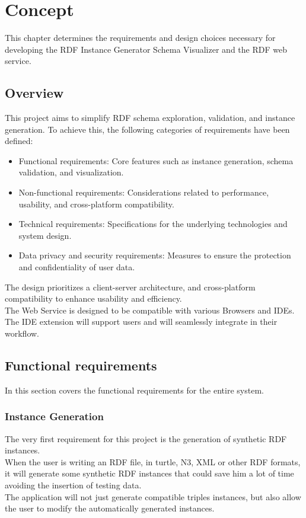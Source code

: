 \chapter{Concept\label{cha:chapter3}}
This chapter determines the requirements and design choices necessary for developing the RDF Instance Generator Schema Visualizer and the RDF web service.

\section{Overview\label{sec:reqoverview}}

This project aims to simplify RDF schema exploration, validation, and instance generation. To achieve this, the following categories of requirements have been defined:
\begin{itemize}
    \item Functional requirements: Core features such as instance generation, schema validation, and visualization.
    \item Non-functional requirements: Considerations related to performance, usability, and cross-platform compatibility.
    \item Technical requirements: Specifications for the underlying technologies and system design.
    \item Data privacy and security requirements: Measures to ensure the protection and confidentiality of user data.
\end{itemize}

The design prioritizes a client-server architecture, and cross-platform compatibility to enhance usability and efficiency. 
\\
The Web Service is designed to be compatible with various Browsers and IDEs. 
\\
The IDE extension will support users and will seamlessly integrate in their workflow.
\section{Functional requirements\label{sec:techreq}}
In this section covers the functional requirements for the entire system.

\subsection{Instance Generation\label{sec:reqsuba}}
The very first requirement for this project is the generation of synthetic RDF instances.
\\
When the user is writing an RDF file, in turtle, N3, XML or other RDF formats, it will generate some synthetic RDF instances that could save him a lot of time avoiding the insertion of testing data.
\\
The application will not just generate compatible triples instances, but also allow the user to modify the automatically generated instances.

